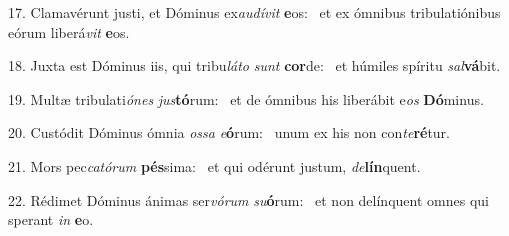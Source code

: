 17. Clamavérunt justi, et Dóminus ex\textit{au}\textit{dí}\textit{vit} \textbf{e}os: \ast\  et ex ómnibus tribulatiónibus eórum liberá\textit{vit} \textbf{e}os.\

18. Juxta est Dóminus iis, qui tribu\textit{lá}\textit{to} \textit{sunt} \textbf{cor}de: \ast\  et húmiles spíritu \textit{sal}\textbf{vá}bit.\

19. Multæ tribulati\textit{ó}\textit{nes} \textit{jus}\textbf{tó}rum: \ast\  et de ómnibus his liberábit e\textit{os} \textbf{Dó}minus.\

20. Custódit Dóminus ómnia \textit{os}\textit{sa} \textit{e}\textbf{ó}rum: \ast\  unum ex his non con\textit{te}\textbf{ré}tur.\

21. Mors pec\textit{ca}\textit{tó}\textit{rum} \textbf{pés}sima: \ast\  et qui odérunt justum, \textit{de}\textbf{lín}quent.\

22. Rédimet Dóminus ánimas ser\textit{vó}\textit{rum} \textit{su}\textbf{ó}rum: \ast\  et non delínquent omnes qui sperant \textit{in} \textbf{e}o.\

